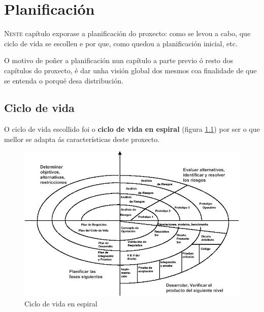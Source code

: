 \chapter{Planificación}
\minitoc
\label{chap:planificacion}
\vspace{0.5cm}


\lettrine{N}{este} capítulo exporase a planificación do proxecto: como se levou a
cabo, que ciclo de vida se escolleu e por que, como quedou a planificación
inicial, etc.

O motivo de poñer a planificación nun capítulo a parte previo ó resto dos
capítulos do proxecto, é dar unha visión global dos mesmos coa finalidade de
que se entenda o porqué desa distribución.

\section{Ciclo de vida}

O ciclo de vida escollido foi o \textbf{ciclo de vida en espiral}
\cite{TemarioES} (figura \ref{figura:CicloVidaEspiral}) por ser o que mellor se
adapta ás características deste proxecto.

\begin{figure}[htbp]
 \centering
 \includegraphics[scale=0.6,keepaspectratio=true]{./imagenes/espiral.jpg}
 \caption[Ciclo de vida en espiral]{Ciclo de vida en espiral \cite{TemarioES}}
 \label{figura:CicloVidaEspiral}
\end{figure}

